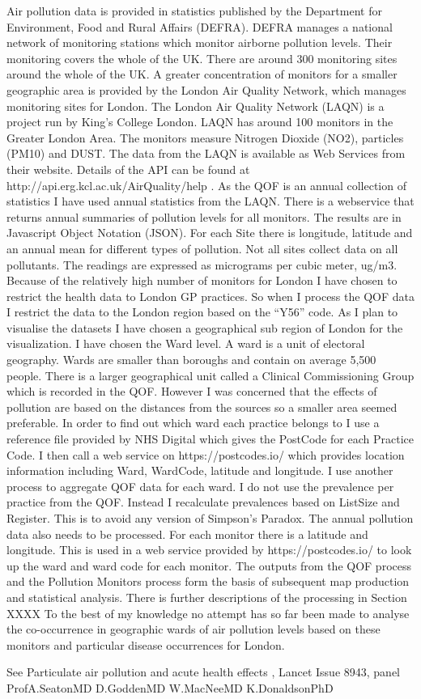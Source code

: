 Air pollution data is provided in statistics published by the Department for Environment, Food and Rural Affairs (DEFRA). DEFRA manages a national network of monitoring stations which monitor airborne pollution levels. Their monitoring covers the whole of the UK. There are around 300 monitoring sites around the whole of the UK. A greater concentration of monitors for a smaller geographic area is provided by the London Air Quality Network, which manages monitoring sites for London. The London Air Quality Network (LAQN) is a project run by King’s College London. LAQN has around 100 monitors in the Greater London Area. The monitors measure Nitrogen Dioxide (NO2), particles (PM10) and DUST. The data from the LAQN is available as Web Services from their website. Details of the API can be found at http://api.erg.kcl.ac.uk/AirQuality/help . 
As the QOF is an annual collection of statistics I have used annual statistics from the LAQN. There is a webservice that returns annual summaries of pollution levels for all monitors. The results are in Javascript Object Notation (JSON). For each Site there is longitude, latitude and an annual mean for different types of pollution. Not all sites collect data on all pollutants. The readings are expressed as micrograms per cubic meter, ug/m3.
Because of the relatively high number of monitors for London I have chosen to restrict the health data to London GP practices. So when I process the QOF data I restrict the data to the London region  based on the “Y56” code. As I plan to visualise the datasets I have chosen a geographical sub region of London for the visualization. I have chosen the Ward level. A ward is a unit of electoral geography.  Wards are smaller than boroughs and contain on average 5,500 people. There is a larger geographical unit called a Clinical Commissioning Group which is recorded in the QOF. However I was concerned that the effects of pollution are based on the distances from the sources so a smaller area seemed preferable. In order to find out which ward each practice belongs to I use a reference file provided by NHS Digital which gives the PostCode for each Practice Code. I then call a web service on https://postcodes.io/ which provides location information including Ward, WardCode, latitude and longitude. I use another process to aggregate QOF data for each ward. I do not use the prevalence per practice from the QOF. Instead I recalculate prevalences based on ListSize and Register. This is to avoid any version of Simpson’s Paradox.
The annual pollution data also needs to be processed. For each monitor there is a latitude and longitude. This is used in a web service provided by https://postcodes.io/ to look up the ward and ward code for each monitor. The outputs from the QOF process and the Pollution Monitors process form the basis of subsequent map production and statistical analysis. There is further descriptions of the processing in Section XXXX
To the best of my knowledge no attempt has so far been made to analyse the co-occurrence in geographic wards of air pollution levels based on these monitors and particular disease occurrences for London.


See Particulate air pollution and acute health effects , Lancet Issue 8943, panel ProfA.SeatonMD D.GoddenMD W.MacNeeMD K.DonaldsonPhD



